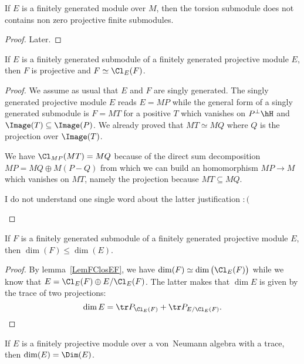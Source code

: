 \begin{proposition}
If $E$ is a finitely generated module over $M$, then the torsion submodule does not contains non zero projective finite submodules.
\end{proposition}

\begin{proof}
Later.
\end{proof}


\begin{lemma}			\label{LemFClosEF}
If $E$ is a finitely generated submodule of a finitely generated projective module $E$, then $F$ is projective and $F\simeq \Cl_E(F)$.
\end{lemma}

\begin{proof}
We assume as usual that $E$ and $F$ are singly generated. The singly generated projective module $E$ reads $E=MP$ while the general form of a singly generated submodule is $F=MT$ for a positive $T$ which vanishes on $P^{\perp}\hH$ and $\Image(T)\subseteq\Image(P)$. We already proved that $MT\simeq MQ$ where $Q$ is the projection over $\Image(T)$.

We have $\Cl_{MP}(MT)=MQ$ because of the direct sum decomposition $MP=MQ\oplus M(P-Q)$ from which we can build an homomorphism $MP\to M$ which vanishes on $MT$, namely the projection  because $MT\subseteq MQ$.
\begin{probleme}
I do not understand one single word about the latter justification $:($
\end{probleme}
\end{proof}

\begin{corollary}		\label{Corfgfgdilleqdim}
If $F$ is a finitely generated submodule of a finitely generated projective module $E$, then $\dim(F)\leq\dim(E)$.
\end{corollary}

\begin{proof}
By lemma~\ref{LemFClosEF}, we have $\dim(F)\simeq\dim\big( \Cl_E(F) \big)$ while we know that $E=\Cl_E(F)\oplus E/\Cl_E(F)$. The latter makes that $\dim E$ is given by the trace of two projections:
\begin{equation}
	\dim E=\tr P_{\Cl_E(F)}+\tr P_{E/\Cl_E(F)}.
\end{equation}
\end{proof}

\begin{corollary}
If $E$ is a finitely projective module over a von~Neumann algebra with a trace, then $\dim(E)=\Dim(E)$.
\end{corollary}

